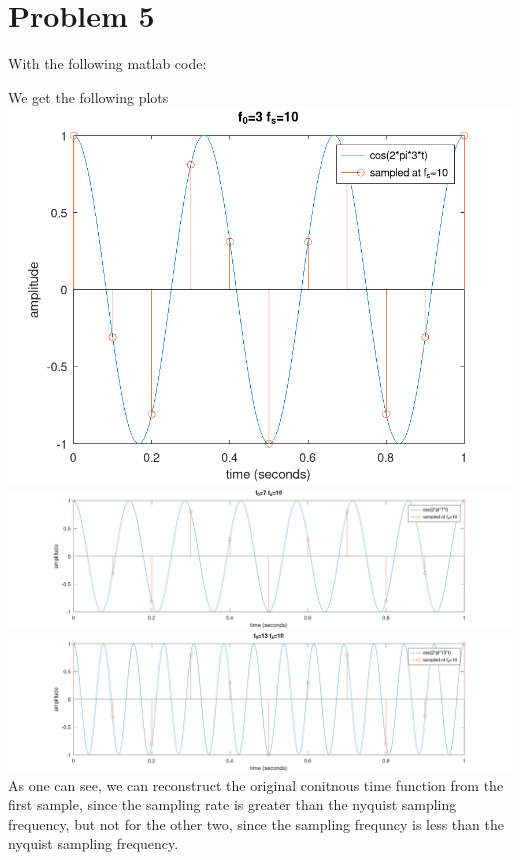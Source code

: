 \section*{Problem 5}
With the following matlab code:

We get the following plots\\
\includegraphics[scale=0.2]{f_03.png}\\
\includegraphics[scale=0.2]{f_07.png}\\
\includegraphics[scale=0.2]{f_013.png}\\
As one can see, we can reconstruct the original conitnous time function from the first sample, since the sampling rate is greater than the nyquist sampling frequency, but not for the other two, since the sampling frequncy is less than the nyquist sampling frequency.





